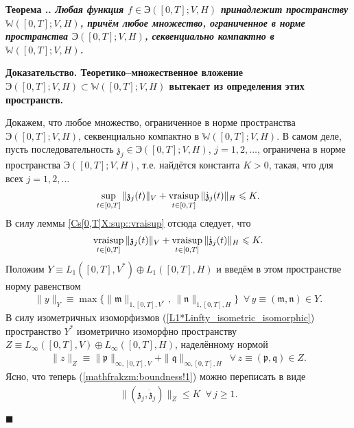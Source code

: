 \documentclass{report}
\newcounter{rem}[section]
\newcounter{theor}[section]
\renewcommand{\thetheor}{\thesection.\arabic{theor}}
\newenvironment{Theorem}{\par\refstepcounter{theor}\bf Теорема \thetheor. \it}{\rm\par}
\newenvironment{Proof}{\par\noindent\bf Доказательство.\rm}{ $\blacksquare$\par}
\newcommand{\vraisup}{\mathop{\rm vraisup}}
\begin{document}
\begin{Theorem}\label{sequential.compactness.in.mathbbW}
Любая функция $f\in \textrm{Э}([0,T];V,H)$ принадлежит пространству $\mathbb{W}([0,T];V,H)$, причём любое множество, ограниченное в норме пространства $\textrm{Э}([0,T];V,H)$, секвенциально
компактно в $\mathbb{W}([0,T];V,H)$.
\end{Theorem}
\begin{Proof}
Теоретико--множественное вложение $\textrm{Э}([0,T];V,H)\subset \mathbb{W}([0,T];V,H)$ вытекает из определения этих пространств.

Докажем, что любое множество, ограниченное в норме пространства $\textrm{Э}([0,T];V,H)$, секвенциально компактно в $\mathbb{W}([0,T];V,H)$. В самом деле, пусть последовательность
$\mathfrak{z}_j\in \textrm{Э}([0,T];V,H)$, $j=1,2,\dots$, ограничена в норме пространства $\textrm{Э}([0,T];V,H)$, т.е. найдётся константа $K>0$, такая, что для всех $j=1,2,\dots$
\begin{gather}\label{mathfrakzm:boundness}
\sup\limits_{t\in[0,T]}\|\mathfrak{z}_j(t)\|_V+\vraisup\limits_{t\in[0,T]}\|\dot{\mathfrak{z}}_j(t)\|_H\leqslant K.
\end{gather}
В силу леммы \ref{Cs[0,T]X:sup::vraisup} отсюда следует, что
\begin{gather}\label{mathfrakzm:boundness!1}
\vraisup\limits_{t\in[0,T]}\|\mathfrak{z}_j(t)\|_V+\vraisup\limits_{t\in[0,T]}\|\dot{\mathfrak{z}}_j(t)\|_H\leqslant K.
\end{gather}
Положим $Y\equiv L_1([0,T],V^*)\oplus L_1([0,T],H)$ и введём в этом пространстве норму равенством
\begin{gather*}
\|y\|_Y\equiv\max\{\|\mathfrak{m}\|_{1,[0,T],V^*},\,\|\mathfrak{n}\|_{1,[0,T],H}\}\,\,\,\forall\,y\equiv(\mathfrak{m},\mathfrak{n})\in Y.
\end{gather*}
В силу изометричных изоморфизмов (\ref{L1*Linfty_isometric_isomorphic}) пространство $Y^*$ изометрично изоморфно пространству
$Z\equiv L_\infty([0,T],V)\oplus L_\infty([0,T],H)$, наделённому нормой
\begin{gather*}
\|z\|_Z\equiv\|\mathfrak{p}\|_{\infty,[0,T],V}+\|\mathfrak{q}\|_{\infty,[0,T],H}\,\,\,\forall\,z\equiv(\mathfrak{p},\mathfrak{q})\in Z.
\end{gather*}
Ясно, что теперь (\ref{mathfrakzm:boundness!1}) можно переписать в виде
\begin{gather}\label{mathfrakzm:boundness!2}
\|(\mathfrak{z}_j,\dot{\mathfrak{z}}_j)\|_Z\leqslant K\,\,\,\forall\,j\geqslant1.
\end{gather}

\end{Proof}
\end{document}
